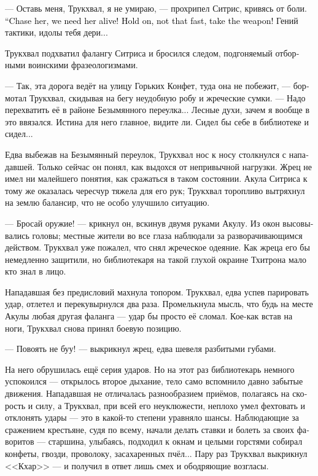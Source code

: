 \documentclass[a4paper,12pt,fleqn]{book}\usepackage{cooltooltips}\usepackage{polyglossia}\setdefaultlanguage{russian}\setotherlanguage{english}\defaultfontfeatures{Ligatures=TeX,Mapping=tex-text} \usepackage{xcolor}\definecolor{lightgray}{HTML}{bbbbbb}\color{lightgray}\newcommand{\ml}[3]{\textenglish{\textcolor{black}{#3}}}
\begin{document}
--- Оставь меня, Трукхвал, я не умираю, --- прохрипел Ситрис, кривясь от боли.
\ml{$0$}
{--- Беги, она нужна нам живой!}
{``Chase her, we need her alive!}
\ml{$0$}
{Да подожди, куда побежал, оружие возьми!}
{Hold on, not that fast, take the weapon!}
Гений тактики, идолы тебя дери...

Трукхвал подхватил фалангу Ситриса и бросился следом, подгоняемый отборными воинскими фразеологизмами.

--- Так, эта дорога ведёт на улицу Горьких Конфет, туда она не побежит, --- бормотал Трукхвал, скидывая на бегу неудобную робу и жреческие сумки.
--- Надо перехватить её в районе Безымянного переулка...
Лесные духи, зачем я вообще в это ввязался.
Истина для него главное, видите ли.
Сидел бы себе в библиотеке и сидел...

Едва выбежав на Безымянный переулок, Трукхвал нос к носу столкнулся с нападавшей.
Только сейчас он понял, как выдохся от непривычной нагрузки.
Жрец не имел ни малейшего понятия, как сражаться в таком состоянии.
Акула Ситриса к тому же оказалась чересчур тяжела для его рук;
Трукхвал торопливо вытряхнул на землю балансир, что не особо улучшило ситуацию.

--- Бросай оружие! --- крикнул он, вскинув двумя руками Акулу.
Из окон высовывались головы;
местные жители во все глаза наблюдали за разворачивающимся действом.
Трукхвал уже пожалел, что снял жреческое одеяние.
Как жреца его бы немедленно защитили, но библиотекаря на такой глухой окраине Тхитрона мало кто знал в лицо.

Нападавшая без предисловий махнула топором.
Трукхвал, едва успев парировать удар, отлетел и перекувырнулся два раза.
Промелькнула мысль, что будь на месте Акулы любая другая фаланга --- удар бы просто её сломал.
Кое-как встав на ноги, Трукхвал снова принял боевую позицию.

--- Повоять не буу! --- выкрикнул жрец, едва шевеля разбитыми губами.

На него обрушилась ещё серия ударов.
Но на этот раз библиотекарь немного успокоился --- открылось второе дыхание, тело само вспомнило давно забытые движения.
Нападавшая не отличалась разнообразием приёмов, полагаясь на скорость и силу, а Трукхвал, при всей его неуклюжести, неплохо умел фехтовать и отклонять удары --- это в какой-то степени уравняло шансы.
Наблюдающие за сражением крестьяне, судя по всему, начали делать ставки и болеть за своих фаворитов --- старшина, улыбаясь, подходил к окнам и целыми горстями собирал конфеты, гвозди, проволоку, засахаренных пчёл...
Пару раз Трукхвал выкрикнул <<Кхар>> --- и получил в ответ лишь смех и ободряющие возгласы.
\end{document}
